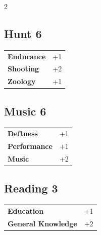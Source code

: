 \begin{multicols}{2}
\begin{tcolorbox}
\end{tcolorbox}

\begin{tcolorbox}
    \subsection*{Hunt \hfill \small{6 }}
    \tcblower




\begin{tabular}{@{}ll@{}}
    \textbf{Endurance} & +1\\
    \textbf{Shooting} & +2\\
    \textbf{Zoology} & +1\\
\end{tabular}


\end{tcolorbox}

\begin{tcolorbox}
    \subsection*{Music \hfill \small{6 }}
    \tcblower




\begin{tabular}{@{}ll@{}}
    \textbf{Deftness} & +1\\
    \textbf{Performance} & +1\\
    \textbf{Music} & +2\\
\end{tabular}


\end{tcolorbox}

\begin{tcolorbox}
    \subsection*{Reading \hfill \small{3 }}
    \tcblower




\begin{tabular}{@{}ll@{}}
    \textbf{Education} & +1\\
    \textbf{General Knowledge} & +2\\
\end{tabular}


\end{tcolorbox}
\end{multicols}
